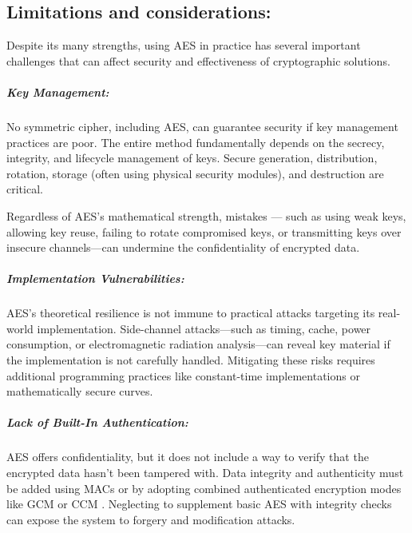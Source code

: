 \subsection{Limitations and considerations:}

Despite its many strengths, using AES in practice has several important challenges that can affect security 
and effectiveness of cryptographic solutions.

\subparagraph{Key Management:}

No symmetric cipher, including AES, can guarantee security if key management practices are poor. The entire 
method fundamentally depends on the secrecy, integrity, and lifecycle management of keys. Secure generation, 
distribution, rotation, storage (often using physical security modules), and destruction are critical.

Regardless of AES's mathematical strength, mistakes — such as using weak keys, allowing key reuse, failing to 
rotate compromised keys, or transmitting keys over insecure channels—can undermine the confidentiality of 
encrypted data.

\subparagraph{Implementation Vulnerabilities:}

AES's theoretical resilience is not immune to practical attacks targeting its real-world implementation. 
Side-channel attacks—such as timing, cache, power consumption, or electromagnetic radiation analysis—can 
reveal key material if the implementation is not carefully handled. Mitigating these risks requires additional 
programming practices like constant-time implementations or mathematically secure curves.

\subparagraph{Lack of Built-In Authentication:}
AES offers confidentiality, but it does not include a way to verify that the encrypted data hasn't been tampered 
with. Data integrity and authenticity must be added using \Gls{MAC}s or by adopting combined authenticated encryption 
modes like \Gls{GCM} or \Gls{CCM} \cite{rfc4494}. Neglecting to supplement basic AES with integrity checks can expose the system to forgery 
and modification attacks.